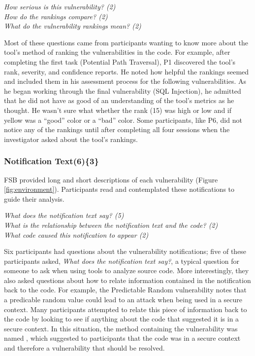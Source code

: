 \documentclass{acm_proc_article-sp}
\begin{document}
\noindent\emph{How serious is this vulnerability? (2)} \\
\emph{How do the rankings compare? (2)} \\
\emph{What do the vulnerability rankings mean? (2)}

 
Most of these questions came from participants wanting to know more about the tool's method of ranking the vulnerabilities in the code.
For example, after completing the first task (Potential Path Traversal), P1 discovered the tool's rank, severity, and confidence reports. 
He noted how helpful the rankings seemed and included them in his assessment process for the following vulnerabilities.
As he began working through the final vulnerability (SQL Injection), he admitted that he did not have as good of an understanding of the tool's metrics as he thought. 
He wasn't sure what whether the rank (15) was high or low and if yellow was a ``good'' color or a ``bad'' color.
Some participants, like P6, did not notice any of the rankings until after completing all four sessions when the investigator asked about the tool's rankings.


\subsubsection{\textbf{Notification Text(6)\{3\}}}\label{em}

FSB provided long and short descriptions of each vulnerability (Figure \ref{fig:environment}). 
Participants read and contemplated these notifications to guide their analysis.


\noindent\emph{What does the notification text say? (5)} \\
\emph{What is the relationship between the notification text and the code? (2)} \\
\emph{What code caused this notification to appear (2)} 

 
Six participants had questions about the vulnerability notifications; five of these participants asked, \textit{What does the notification text say?}, a typical question for someone to ask when using tools to analyze source code.
More interestingly, they also asked questions about how to relate information contained in the notification back to the code. 
For example, the Predictable Random vulnerability notes that a predicable random value could lead to an attack when being used in a secure context. 
Many participants attempted to relate this piece of information back to the code by looking to see if anything about the code that suggested it is in a secure context. 
In this situation, the method containing the vulnerability was named , which suggested to participants that the code was in a secure context and therefore a vulnerability that should be resolved.
\end{document}
